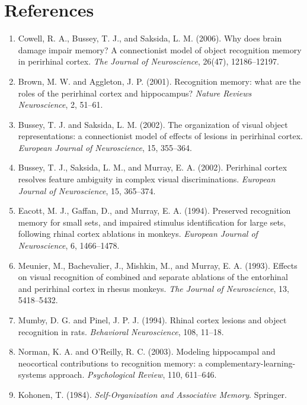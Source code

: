 \documentclass[11pt]{article}
\begin{document}
\section*{References}
\begin{enumerate}[leftmargin=*]
\item Cowell, R. A., Bussey, T. J., and Saksida, L. M. (2006). Why does brain damage impair memory? A connectionist model of object recognition memory in perirhinal cortex. \textit{The Journal of Neuroscience}, 26(47), 12186--12197.
\item Brown, M. W. and Aggleton, J. P. (2001). Recognition memory: what are the roles of the perirhinal cortex and hippocampus? \textit{Nature Reviews Neuroscience}, 2, 51--61.
\item Bussey, T. J. and Saksida, L. M. (2002). The organization of visual object representations: a connectionist model of effects of lesions in perirhinal cortex. \textit{European Journal of Neuroscience}, 15, 355--364.
\item Bussey, T. J., Saksida, L. M., and Murray, E. A. (2002). Perirhinal cortex resolves feature ambiguity in complex visual discriminations. \textit{European Journal of Neuroscience}, 15, 365--374.
\item Eacott, M. J., Gaffan, D., and Murray, E. A. (1994). Preserved recognition memory for small sets, and impaired stimulus identification for large sets, following rhinal cortex ablations in monkeys. \textit{European Journal of Neuroscience}, 6, 1466--1478.
\item Meunier, M., Bachevalier, J., Mishkin, M., and Murray, E. A. (1993). Effects on visual recognition of combined and separate ablations of the entorhinal and perirhinal cortex in rhesus monkeys. \textit{The Journal of Neuroscience}, 13, 5418--5432.
\item Mumby, D. G. and Pinel, J. P. J. (1994). Rhinal cortex lesions and object recognition in rats. \textit{Behavioral Neuroscience}, 108, 11--18.
\item Norman, K. A. and O'Reilly, R. C. (2003). Modeling hippocampal and neocortical contributions to recognition memory: a complementary-learning-systems approach. \textit{Psychological Review}, 110, 611--646.
\item Kohonen, T. (1984). \textit{Self-Organization and Associative Memory}. Springer.
\end{enumerate}
\end{document}
